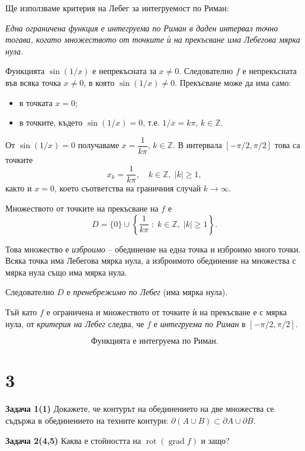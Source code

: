 \documentclass[10pt]{article}
\begin{document}
Ще използваме критерия на Лебег за интегруемост по Риман:

\vspace{0.2cm}
\noindent
\textit{Една ограничена функция е интегруема по Риман в даден интервал точно тогава, когато множеството от точките ѝ на прекъсване има Лебегова мярка нула.}

\vspace{0.2cm}
\noindent
Функцията $\sin(1/x)$ е непрекъсната за $x \ne 0$. Следователно $f$ е непрекъсната във всяка точка $x \ne 0$, в която $\sin(1/x) \ne 0$. Прекъсване може да има само:
\begin{itemize}
    \item в точката $x = 0$;
    \item в точките, където $\sin(1/x) = 0$, т.е. $1/x = k\pi$, $k \in \mathbb{Z}$.
\end{itemize}

От $\sin(1/x) = 0$ получаваме $x = \dfrac{1}{k\pi}$, $k \in \mathbb{Z}$. В интервала $[-\pi/2,\pi/2]$ това са точките
\[
x_k = \frac{1}{k\pi}, \quad k \in \mathbb{Z},\; |k| \ge 1,
\]
както и $x = 0$, което съответства на граничния случай $k \to \infty$.

Множеството от точките на прекъсване на $f$ е
\[
D = \{0\} \cup \left\{ \frac{1}{k\pi} \;:\; k \in \mathbb{Z},\; |k| \ge 1 \right\}.
\]

Това множество е \textit{изброимо} – обединение на една точка и изброимо много точки. Всяка точка има Лебегова мярка нула, а изброимото обединение на множества с мярка нула също има мярка нула.

Следователно $D$ е \textit{пренебрежимо по Лебег} (има мярка нула).

Тъй като $f$ е ограничена и множеството от точките ѝ на прекъсване е с мярка нула, от \textit{критерия на Лебег} следва, че $f$ е \textit{интегруема по Риман} в $[-\pi/2,\pi/2]$.

\[
\boxed{\text{Функцията е интегруема по Риман.}}
\]



\section*{3}

\textbf{Задача 1(1) }Докажете, че контурът на обединението на две множества се съдържа в обединението на техните контури: $\partial(A \cup B) \subset \partial A \cup \partial B$. 

\textbf{Задача 2(4,5) }Каква е стойността на $\operatorname{rot}(\operatorname{grad} f)$ и защо?
\end{document}
